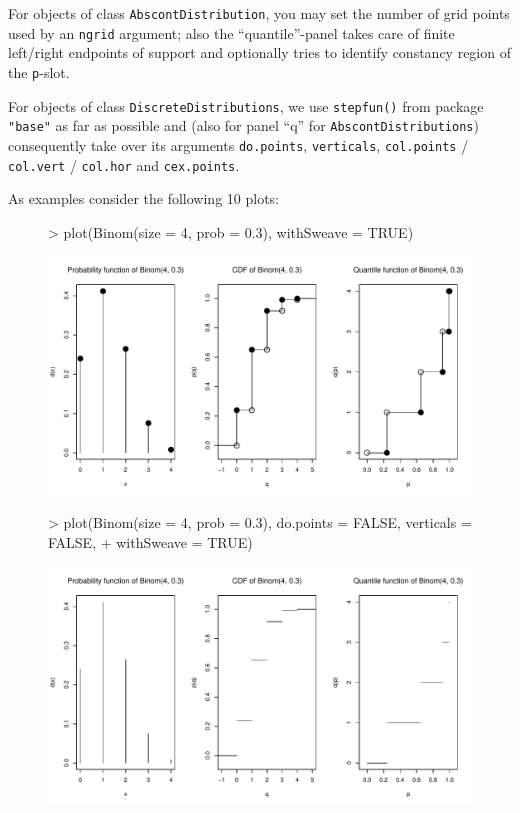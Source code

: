 \documentclass[11pt]{article}
\newcommand{\code}[1]{{\tt #1}}
\newcommand{\pkg}[1]{{\tt "#1"}}
\begin{document}
For objects of class \code{AbscontDistribution}, you may set the number of grid
points used by an \code{ngrid} argument; also the ``quantile''-panel
takes care of finite left/right endpoints of support and optionally tries
to identify constancy region of the \code{p}-slot.

For objects of class \code{DiscreteDistributions}, we use \code{stepfun()} from
package \pkg{base} as far as possible and (also for panel ``q'' for
\code{AbscontDistributions}) consequently take over its arguments
\code{do.points}, \code{verticals}, \code{col.points} / \code{col.vert} /
\code{col.hor} and \code{cex.points}.

As examples consider the following 10 plots:


\begin{figure}[p]
\begin{Schunk}
\begin{Sinput}
> plot(Binom(size = 4, prob = 0.3), withSweave = TRUE)
\end{Sinput}
\end{Schunk}
\includegraphics{distr-plotex1}
\end{figure}
\begin{figure}[p]
\begin{Schunk}
\begin{Sinput}
> plot(Binom(size = 4, prob = 0.3), do.points = FALSE, verticals = FALSE,
+      withSweave = TRUE)
\end{Sinput}
\end{Schunk}
\includegraphics{distr-plotex2}
\end{figure}
\end{document}
